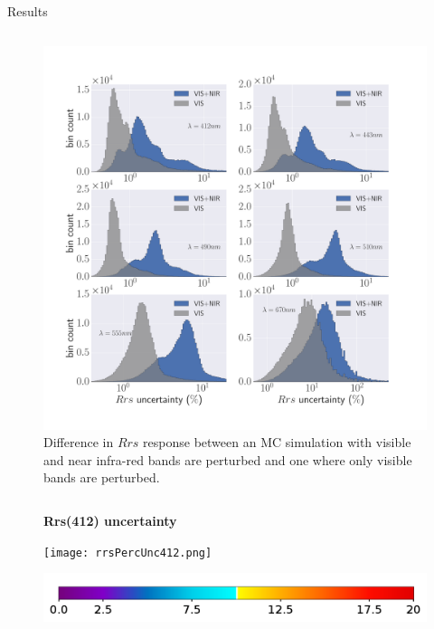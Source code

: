 \documentclass[final]{beamer}
\newlength{\onecolwid}
\newlength{\twocolwid}
\begin{document}
\begin{frame}[t]
\begin{columns}[t]
\begin{column}{\twocolwid}
\begin{block}{Results}
\begin{columns}[t,totalwidth=\twocolwid]
\begin{column}{\onecolwid}
\begin{figure}
\vspace{2ex}
\caption{ Difference in $Rrs$ response between an MC simulation with visible and near infra-red bands are perturbed and one where only visible bands are perturbed.}
\includegraphics[width=1.0\linewidth]{Vis_vs_VISNIR.pdf}
\end{figure}
\end{column} %

\end{columns} %

\end{block}
\begin{figure}
\centering
\textbf{Rrs(412) uncertainty}\par\medskip
\texttt{[image: rrsPercUnc412.png]}
\end{figure}

\begin{figure}
\includegraphics[width=0.5\linewidth,keepaspectratio]{rrsUNCcolorbar.png}
\end{figure}


\end{column}
\end{columns}
\end{frame}
\end{document}
